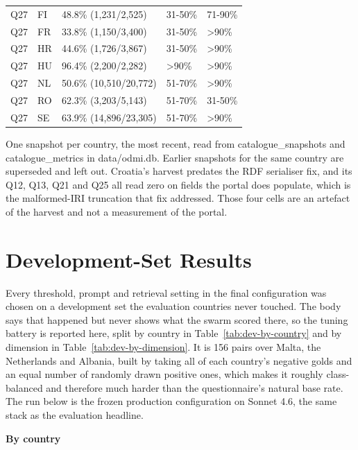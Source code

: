{\begin{longtable}[]{@{}
  L{0.1274}
  L{0.1177}
  L{0.3333}
  L{0.1470}
  L{0.2745}@{}}
Q27 & FI & 48.8\% (1,231/2,525) & 31-50\% & 71-90\% \\
Q27 & FR & 33.8\% (1,150/3,400) & 31-50\% & \textgreater90\% \\
Q27 & HR & 44.6\% (1,726/3,867) & 31-50\% & \textgreater90\% \\
Q27 & HU & 96.4\% (2,200/2,282) & \textgreater90\% & \textgreater90\% \\
Q27 & NL & 50.6\% (10,510/20,772) & 51-70\% & \textgreater90\% \\
Q27 & RO & 62.3\% (3,203/5,143) & 51-70\% & 31-50\% \\
Q27 & SE & 63.9\% (14,896/23,305) & 51-70\% & \textgreater90\% \\
\end{longtable}
}


One snapshot per country, the most recent, read from \mbox{catalogue\_snapshots} and \mbox{catalogue\_metrics} in data/odmi.db. Earlier snapshots for the same country are superseded and left out. Croatia's harvest predates the RDF serialiser fix, and its Q12, Q13, Q21 and Q25 all read zero on fields the portal does populate, which is the malformed-IRI truncation that fix addressed. Those four cells are an artefact of the harvest and not a measurement of the portal.

\chapter{Development-Set Results}\label{app:dev-results}

Every threshold, prompt and retrieval setting in the final configuration was chosen on a development set the evaluation countries never touched. The body says that happened but never shows what the swarm scored there, so the tuning battery is reported here, split by country in Table~\ref{tab:dev-by-country} and by dimension in Table~\ref{tab:dev-by-dimension}. It is 156 pairs over Malta, the Netherlands and Albania, built by taking all of each country's negative golds and an equal number of randomly drawn positive ones, which makes it roughly class-balanced and therefore much harder than the questionnaire's natural base rate. The run below is the frozen production configuration on Sonnet 4.6, the same stack as the evaluation headline.

\textbf{By country}

